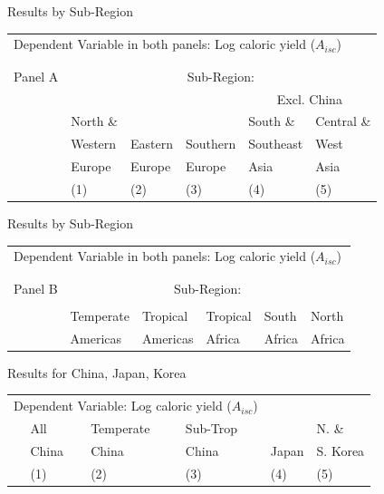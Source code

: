 \documentclass[10pt, xcolor=dvipsnames]{beamer}
\begin{document}
\begin{frame}{Results by Sub-Region}

{\scriptsize
\begin{tabularx}{\textwidth}{lXXXXX}
\midrule
\multicolumn{6}{l}{Dependent Variable in both panels: Log caloric yield ($A_{isc}$)} \\ \\
\\
Panel A & \multicolumn{5}{c}{Sub-Region:} \\ \cmidrule{2-6}
 &          &         &             &  \multicolumn{2}{c}{Excl. China} \\ \cmidrule(lr){5-6}
 & North \& &         &              & South \&  & Central \&             \\
 & Western  & Eastern & Southern     & Southeast & West        \\
 & Europe   & Europe  & Europe       & Asia      & Asia      \\
 & (1) & (2) & (3) & (4) & (5) \\
\midrule

\midrule
\end{tabularx}
}
\end{frame}

\begin{frame}{Results by Sub-Region}

{\scriptsize
\begin{tabularx}{\textwidth}{lXXXXX}
\midrule
\multicolumn{6}{l}{Dependent Variable in both panels: Log caloric yield ($A_{isc}$)} \\ \\
\\
Panel B & \multicolumn{5}{c}{Sub-Region:} \\ \cmidrule{2-6}
 &           &   &           &          &             \\
 & Temperate & Tropical  & Tropical & South    & North    \\
 & Americas  & Americas  & Africa   & Africa   & Africa     \\
\midrule

\midrule
\end{tabularx}
}

\end{frame}

\begin{frame}{Results for China, Japan, Korea}

{\scriptsize
\begin{tabularx}{\textwidth}{lXXXXX}
\midrule
\multicolumn{4}{l}{Dependent Variable: Log caloric yield ($A_{isc}$)} \\
 & All& Temperate & Sub-Trop & & N. \& \\
 & China & China  & China & Japan & S. Korea  \\
 & (1) & (2) & (3) & (4) & (5) \\
\midrule

\midrule
\end{tabularx}
}

\end{frame}
\end{document}
